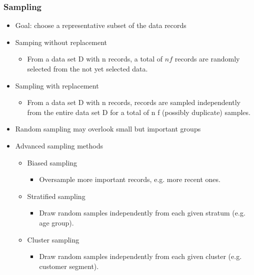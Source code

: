 \documentclass[../notes.tex]{subfiles}
\begin{document}
\subsubsection{Sampling}
\begin{itemize}
  \item Goal: choose a representative subset of the data records
  
  \item Samping without replacement
  \begin{itemize}
    \item From a data set D with n records, a total of $nf$ records are randomly selected from the not yet selected data.
  \end{itemize}

  \item Sampling with replacement
  \begin{itemize}
    \item From a data set D with n records, records are sampled independently from the entire data set D for a total of n f (possibly duplicate) samples.
  \end{itemize}

  \item Random sampling may overlook small but important groups

  \item Advanced sampling methods
  \begin{itemize}
    \item Biased sampling
    \begin{itemize}
      \item Oversample more important records, e.g. more recent ones.
    \end{itemize}

    \item Stratified sampling
    \begin{itemize}
      \item Draw random samples independently from each given stratum (e.g. age group).
    \end{itemize}

    \item Cluster sampling
    \begin{itemize}
      \item Draw random samples independently from each given cluster (e.g. customer segment).
    \end{itemize}

  \end{itemize}

\end{itemize} 
\end{document}
